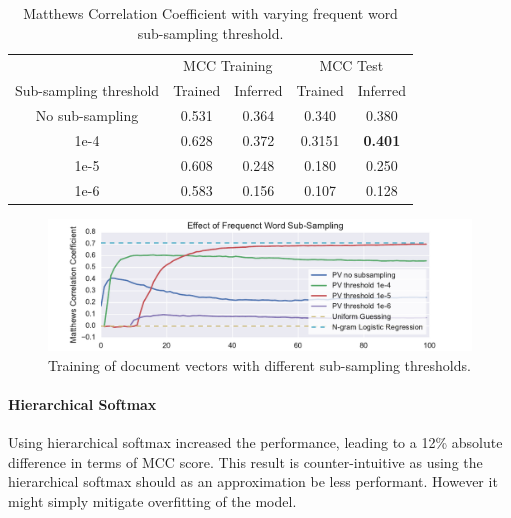 \begin{table}[h]
  \begin{center}
    \begin{tabular}{ c | *2c | *2c }
      \toprule
       & \multicolumn{2}{c|}{MCC Training} & \multicolumn{2}{|c}{MCC Test}\\
      Sub-sampling threshold & Trained & Inferred & Trained & Inferred \\
      \midrule
      No sub-sampling & 0.531 & 0.364 & 0.340 & 0.380 \\
      1e-4 & 0.628 & 0.372 & 0.3151 & \textbf{0.401} \\
      1e-5 & 0.608 & 0.248 & 0.180 & 0.250 \\
      1e-6 & 0.583 & 0.156 & 0.107 & 0.128 \\
    \bottomrule
  \end{tabular}
  \caption{Matthews Correlation Coefficient with varying frequent word sub-sampling threshold.}
\label{tab:Paragraph Vector Parameter Results Sample}
\end{center}
\end{table}


\begin{figure}[h]
    \centering
    \includegraphics[width=\textwidth]{img/exp-vector-space-doc2vec-param-sample.pdf}
    \caption{Training of document vectors with different sub-sampling thresholds.}
  \label{fig:exp-vector-space-doc2vec-param-sample}
\end{figure}

\paragraph{Hierarchical Softmax}
Using hierarchical softmax increased the performance, leading to a 12\% absolute difference in terms of MCC score. This result is counter-intuitive as using the hierarchical softmax should as an approximation be less performant. However it might simply mitigate overfitting of the model.

